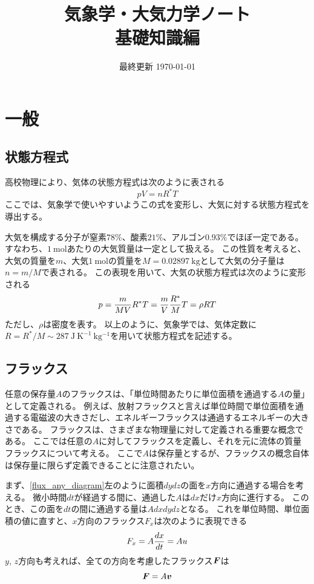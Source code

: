 \documentclass[a4paper,11pt,platex]{jsarticle}
\title{気象学・大気力学ノート\\基礎知識編}
\date{最終更新 \today}
\numberwithin{equation}{section}
\begin{document}
\maketitle

\clearpage
\tableofcontents
\clearpage
{}


\section{一般}


\subsection{状態方程式}
高校物理により、気体の状態方程式は次のように表される
\begin{equation}
    pV = nR^*T
\end{equation}
ここでは、気象学で使いやすいようこの式を変形し、大気に対する状態方程式を導出する。

大気を構成する分子が窒素$78\%$、酸素$21\%$、アルゴン$0.93\%$でほぼ一定である。
すなわち、$1 \: \mathrm{mol}$あたりの大気質量は一定として扱える。
この性質を考えると、大気の質量を$m$、大気$1 \: \mathrm{mol}$の質量を$M=0.02897 \:\mathrm{kg}$として大気の分子量は$n=m/M$で表される。
この表現を用いて、大気の状態方程式は次のように変形される
\begin{equation}
    \label{equation_of_state}
    p = {m \over MV} R^* T
      = {m \over V} {R^* \over M} T
      = \rho RT
\end{equation}
ただし、$\rho$は密度を表す。
以上のように、気象学では、気体定数に$R=R^*/M \sim 287 \: \mathrm{J \: K^{-1} \: kg^{-1}}$を用いて状態方程式を記述する。


\subsection{フラックス}
任意の保存量$A$のフラックスは、「単位時間あたりに単位面積を通過する$A$の量」として定義される。
例えば、放射フラックスと言えば単位時間で単位面積を通過する電磁波の大きさだし、エネルギーフラックスは通過するエネルギーの大きさである。
フラックスは、さまざまな物理量に対して定義される重要な概念である。
ここでは任意の$A$に対してフラックスを定義し、それを元に流体の質量フラックスについて考える。
ここで$A$は保存量とするが、フラックスの概念自体は保存量に限らず定義できることに注意されたい。

まず、\autoref{flux_any_diagram}左のように面積$dydz$の面を$x$方向に通過する場合を考える。
微小時間$dt$が経過する間に、通過した$A$は$dx$だけ$x$方向に進行する。
このとき、この面を$dt$の間に通過する量は$Adxdydz$となる。
これを単位時間、単位面積の値に直すと、$x$方向のフラックス$F_x$は次のように表現できる
\begin{equation}
    F_x = A{dx \over dt} = Au
\end{equation}
$y$, $z$方向も考えれば、全ての方向を考慮したフラックス$\vb*{F}$は
\begin{equation}
    \vb*{F} = A\vb*{v}
\end{equation}
\end{document}
